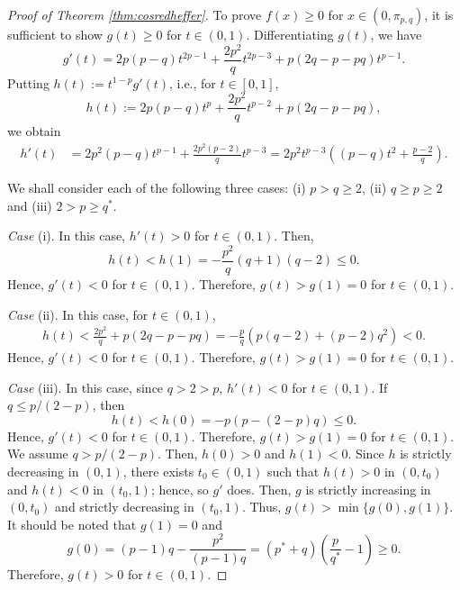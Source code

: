 \documentclass[10pt,a4paper]{amsart}
\begin{document}
\begin{proof}[Proof of Theorem \ref{thm:cosredheffer}]
To prove $f(x) \geq 0$ for $x \in (0,\pi_{p,q})$, it is sufficient to show $g(t) \geq 0$ for $t \in (0,1)$.
Differentiating $g(t)$, we have
\[g'(t)
=2p(p-q)t^{2p-1}
+\frac{2p^2}{q}t^{2p-3}
+p(2q-p-pq)t^{p-1}.\]
Putting $h(t):=t^{1-p}g'(t)$, i.e., for $t \in [0,1]$,
\[h(t)
:=2p(p-q)t^p+\frac{2p^2}{q}t^{p-2}+p(2q-p-pq),\]
we obtain
\begin{align*}
h'(t)
&=2p^2(p-q)t^{p-1}+\frac{2p^2(p-2)}{q}t^{p-3}
=2p^2t^{p-3}\left((p-q)t^2+\frac{p-2}{q}\right).
\end{align*}

We shall consider each of the following three cases:
(i) $p>q \geq 2$, (ii) $q \geq p \geq 2$
and (iii) $2>p \geq q^*$.

\textit{Case} (i).
In this case, $h'(t)>0$ for $t \in (0,1)$.
Then, 
\[h(t)<h(1)=-\frac{p^2}{q}(q+1)(q-2) \leq 0.\]
Hence, $g'(t)<0$ for $t \in (0,1)$.
Therefore, $g(t)>g(1)=0$ for $t \in (0,1)$.

\textit{Case} (ii).
In this case, for $t \in (0,1)$,
\begin{align*}
h(t)
<\frac{2p^2}{q}+p(2q-p-pq)
=-\frac{p}{q}(p(q-2)+(p-2)q^2)<0.
\end{align*}
Hence, $g'(t)<0$ for $t \in (0,1)$.
Therefore, $g(t)>g(1)=0$ for $t \in (0,1)$.

\textit{Case} (iii).
In this case, since $q>2>p$, $h'(t)<0$ for 
$t \in (0,1)$. 
If $q \leq p/(2-p)$, then 
\[h(t)<h(0)=-p(p-(2-p)q) \leq 0.\]
Hence, $g'(t)<0$ for $t \in (0,1)$.
Therefore, $g(t)>g(1)=0$ for $t \in (0,1)$.
We assume $q >p/(2-p)$. Then,
$h(0) >0$ and $h(1)<0$.
Since $h$ is strictly decreasing in $(0,1)$,
there exists $t_0 \in (0,1)$ such that 
$h(t)>0$ in $(0,t_0)$ and $h(t)<0$ in $(t_0,1)$;
hence, so $g'$ does. Then, $g$ is strictly increasing
in $(0,t_0)$ and strictly decreasing in $(t_0,1)$.
Thus, $g(t)>\min\{g(0),g(1)\}$.
It should be noted that $g(1)=0$ and 
\[g(0)=(p-1)q-\frac{p^2}{(p-1)q}
=(p^*+q)\left(\frac{p}{q^*}-1\right) \geq 0.\] 
Therefore, $g(t)>0$ for $t \in (0,1)$.
\end{proof}
\end{document}
